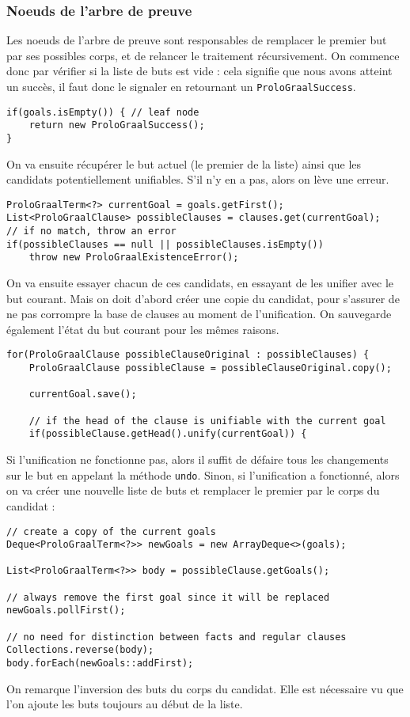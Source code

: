 \documentclass[../report.tex]{subfiles}
\begin{document}
\subsubsection{Noeuds de l'arbre de preuve}
Les noeuds de l'arbre de preuve sont responsables de remplacer le premier but par ses possibles corps, et de relancer le traitement récursivement. On commence donc par vérifier si la liste de buts est vide : cela signifie que nous avons atteint un succès, il faut donc le signaler en retournant un \texttt{ProloGraalSuccess}.
\begin{verbatim}
if(goals.isEmpty()) { // leaf node
    return new ProloGraalSuccess();
}
\end{verbatim}
On va ensuite récupérer le but actuel (le premier de la liste) ainsi que les candidats potentiellement unifiables. S'il n'y en a pas, alors on lève une erreur.
\begin{verbatim}
ProloGraalTerm<?> currentGoal = goals.getFirst();
List<ProloGraalClause> possibleClauses = clauses.get(currentGoal);
// if no match, throw an error
if(possibleClauses == null || possibleClauses.isEmpty())
    throw new ProloGraalExistenceError();
\end{verbatim}
On va ensuite essayer chacun de ces candidats, en essayant de les unifier avec le but courant. Mais on doit d'abord créer une copie du candidat, pour s'assurer de ne pas corrompre la base de clauses au moment de l'unification. On sauvegarde également l'état du but courant pour les mêmes raisons. 
\begin{verbatim}
for(ProloGraalClause possibleClauseOriginal : possibleClauses) {
    ProloGraalClause possibleClause = possibleClauseOriginal.copy();

    currentGoal.save();

    // if the head of the clause is unifiable with the current goal
    if(possibleClause.getHead().unify(currentGoal)) {
\end{verbatim}
Si l'unification ne fonctionne pas, alors il suffit de défaire tous les changements sur le but en appelant la méthode \texttt{undo}. Sinon, si l'unification a fonctionné, alors on va créer une nouvelle liste de buts et remplacer le premier par le corps du candidat :
\begin{verbatim}
// create a copy of the current goals
Deque<ProloGraalTerm<?>> newGoals = new ArrayDeque<>(goals);

List<ProloGraalTerm<?>> body = possibleClause.getGoals();

// always remove the first goal since it will be replaced
newGoals.pollFirst();

// no need for distinction between facts and regular clauses
Collections.reverse(body);
body.forEach(newGoals::addFirst);
\end{verbatim}
On remarque l'inversion des buts du corps du candidat. Elle est nécessaire vu que l'on ajoute les buts toujours au début de la liste.
\end{document}
